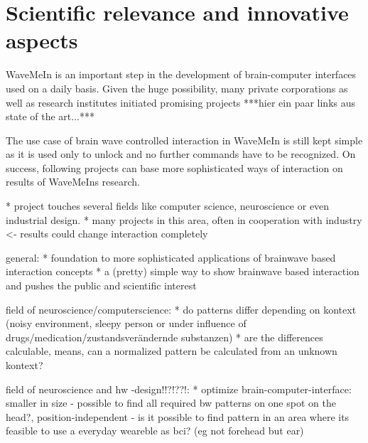 \section{Scientific relevance and innovative aspects}
\label{sect:relevance}

WaveMeIn is an important step in the development of brain-computer interfaces used on a daily basis. Given the huge possibility, many private corporations as well as research institutes initiated promising projects ***hier ein paar links aus state of the art...***

The use case of brain wave controlled interaction in WaveMeIn is still kept simple as it is used only to unlock and no further commands have to be recognized. On success, following projects can base more sophisticated ways of interaction on results of WaveMeIns research.


* project touches several fields like computer science, neuroscience or even industrial design.
* many projects in this area, often in cooperation with industry <- results could change interaction completely
 
 general:
* foundation to more sophisticated applications of brainwave based interaction concepts
* a (pretty) simple way to show brainwave based interaction and pushes the public and scientific  interest
 
field of neuroscience/computerscience:
* do patterns differ depending on kontext (noisy environment, sleepy person or under influence of drugs/medication/zustandsverändernde substanzen)
* are the differences calculable, means, can a normalized pattern be calculated from an unknown kontext?

field of neuroscience and hw -design!!?!??!:
* optimize brain-computer-interface: smaller in size - possible to find all required bw patterns on one spot on the head?, position-independent - is it possible to find pattern in an area where its feasible to use a everyday weareble as bci? (eg not forehead but ear)


